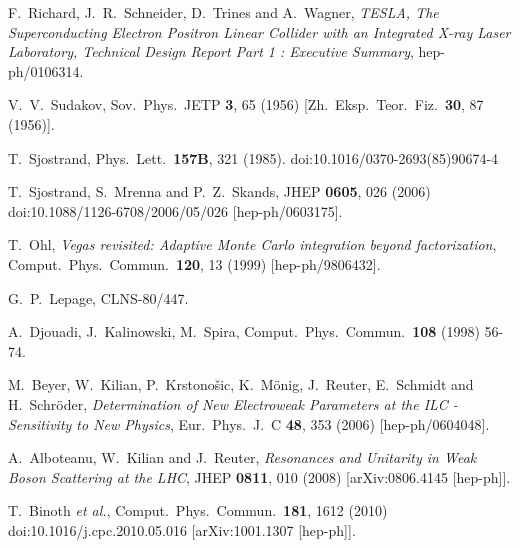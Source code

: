 \documentclass[12pt]{book}
\begin{document}
\begin{thebibliography}{19}
  F.~Richard, J.~R.~Schneider, D.~Trines and A.~Wagner,
  {\em TESLA, The Superconducting Electron Positron Linear Collider
    with an Integrated X-ray Laser Laboratory, Technical Design Report
    Part 1 : Executive Summary},
  hep-ph/0106314.

  V.~V.~Sudakov,
  Sov.\ Phys.\ JETP {\bf 3}, 65 (1956)
  [Zh.\ Eksp.\ Teor.\ Fiz.\  {\bf 30}, 87 (1956)].

\cite{Sjostrand:1985xi}
  T.~Sjostrand,
  Phys.\ Lett.\  {\bf 157B}, 321 (1985).
  doi:10.1016/0370-2693(85)90674-4

  T.~Sjostrand, S.~Mrenna and P.~Z.~Skands,
  JHEP {\bf 0605}, 026 (2006)
  doi:10.1088/1126-6708/2006/05/026
  [hep-ph/0603175].

  T.~Ohl,
  {\em Vegas revisited: Adaptive Monte Carlo integration beyond
    factorization},
  Comput.\ Phys.\ Commun.\  {\bf 120}, 13 (1999)
  [hep-ph/9806432].

  G.~P.~Lepage,
  CLNS-80/447.

  A.~Djouadi, J.~Kalinowski, M.~Spira,
  Comput.\ Phys.\ Commun.\ \textbf{108} (1998) 56-74.

  M.~Beyer, W.~Kilian, P.~Krstono\v{s}ic, K.~M\"onig, J.~Reuter, E.~Schmidt
  and H.~Schr\"oder,
  {\em Determination of New Electroweak Parameters at the ILC -
    Sensitivity to New Physics},
  Eur.\ Phys.\ J.\ C {\bf 48}, 353 (2006)
  [hep-ph/0604048].

  A.~Alboteanu, W.~Kilian and J.~Reuter,
  {\em Resonances and Unitarity in Weak Boson Scattering at the LHC},
  JHEP {\bf 0811}, 010 (2008)
  [arXiv:0806.4145 [hep-ph]].

  T.~Binoth {\it et al.},
  Comput.\ Phys.\ Commun.\  {\bf 181}, 1612 (2010)
  doi:10.1016/j.cpc.2010.05.016
  [arXiv:1001.1307 [hep-ph]].


\end{thebibliography}
\end{document}
